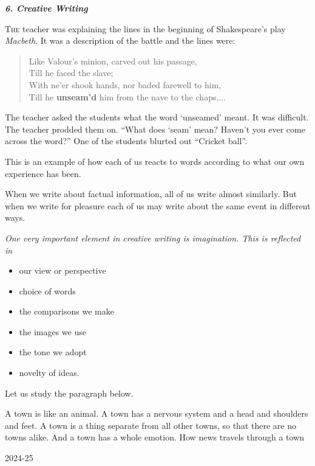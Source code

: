 \documentclass[11pt]{article}
\begin{document}
\begin{flushleft}
    {\huge\bfseries\color{creativepink}\itshape 6. Creative Writing}
\end{flushleft}

\vspace{1.5em}

\noindent \textsc{The} teacher was explaining the lines in the beginning of Shakespeare’s play \textit{Macbeth}. It was a description of the battle and the lines were:

\vspace{1em}
\begin{quote}
    Like Valour’s minion, carved out his passage,\\
    Till he faced the slave;\\
    With ne’er shook hands, nor baded farewell to him,\\
    Till he \textbf{unseam’d} him from the nave to the chaps,...
\end{quote}
\vspace{1em}

\noindent The teacher asked the students what the word ‘unseamed’ meant. It was difficult. The teacher prodded them on. “What does ‘seam’ mean? Haven’t you ever come across the word?” One of the students blurted out “Cricket ball”.

\vspace{1em}
\noindent This is an example of how each of us reacts to words according to what our own experience has been.

\vspace{1em}
\noindent When we write about factual information, all of us write almost similarly. But when we write for pleasure each of us may write about the same event in different ways.

\vspace{1em}
\noindent \textit{One very important element in creative writing is imagination. This is reflected in}

\begin{itemize}[itemsep=0.2em, topsep=0.5em]
    \item our view or perspective
    \item choice of words
    \item the comparisons we make
    \item the images we use
    \item the tone we adopt
    \item novelty of ideas.
\end{itemize}

\vspace{1em}
\noindent Let us study the paragraph below.

\vspace{1em}
\noindent A town is like an animal. A town has a nervous system and a head and shoulders and feet. A town is a thing separate from all other towns, so that there are no towns alike. And a town has a whole emotion. How news travels through a town

\vfill
\begin{center}
    \small 2024-25
\end{center}
\end{document}
